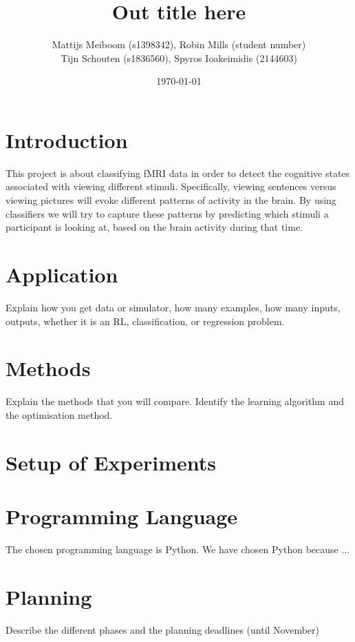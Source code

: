 \documentclass[a4paper, 11pt]{scrartcl}
\title{\Large Out title here}
\author{\small Mattijs Meiboom (s1398342), Robin Mills (student number)\\
			\small Tijn Schouten (s1836560), Spyros Ioakeimidis (2144603)}
\date{\small \today}
\begin{document}
\maketitle

\thispagestyle{empty}

\section{Introduction}

This project is about classifying fMRI data in order to detect the cognitive states associated with viewing different stimuli. Specifically, viewing sentences versus viewing pictures will evoke different patterns of activity in the brain. By using classifiers we will try to capture these patterns by predicting which stimuli a participant is looking at, based on the brain activity during that time.

\section{Application}

Explain how you get data or simulator, how many examples, how many inputs, outputs, whether it is an RL, classification, or regression problem.

\section{Methods}

Explain the methods that you will compare. Identify the learning algorithm and the optimisation method.

\section{Setup of Experiments}

\section{Programming Language}

The chosen programming language is Python. We have chosen Python because ...

\section{Planning}

Describe the different phases and the planning deadlines (until November)
\end{document}
